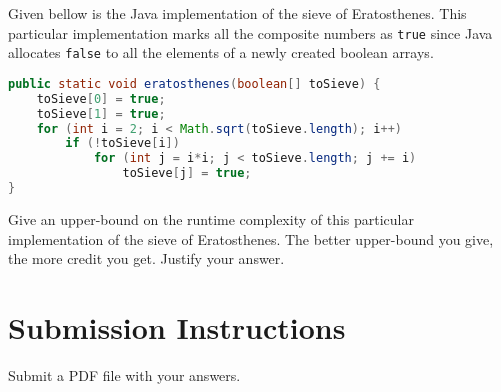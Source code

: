 \documentclass{homework}
\begin{document}
\question Given bellow is the Java implementation of the sieve of
Eratosthenes. This particular implementation marks all the
composite numbers as \texttt{true} since Java allocates
\texttt{false} to all the elements of a newly created boolean
arrays.
\begin{lstlisting}[language=java]
public static void eratosthenes(boolean[] toSieve) {
    toSieve[0] = true;
    toSieve[1] = true;
    for (int i = 2; i < Math.sqrt(toSieve.length); i++)
        if (!toSieve[i])
            for (int j = i*i; j < toSieve.length; j += i)
                toSieve[j] = true;
}
\end{lstlisting}
Give an upper-bound on the runtime complexity of this particular
implementation of the sieve of Eratosthenes. The better
upper-bound you give, the more credit you get. Justify your
answer.

\section*{Submission Instructions}
Submit a PDF file with your answers.
\end{document}
